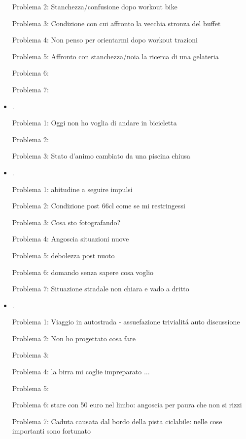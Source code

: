 \begin{itemize}
Problema 2: Stanchezza/confusione dopo workout bike

Problema 3: Condizione con cui affronto la vecchia stronza del buffet

Problema 4: Non penso per orientarmi dopo workout trazioni

Problema 5: Affronto con stanchezza/noia la ricerca di una gelateria

Problema 6: 

Problema 7: 

\item {}.

Problema 1: Oggi non ho voglia di andare in bicicletta

Problema 2: 

Problema 3: Stato d'animo cambiato da una piscina chiusa


\item {}.

Problema 1: abitudine a seguire impulsi

Problema 2: Condizione post 66cl come se mi restringessi

Problema 3: Cosa sto fotografando?

Problema 4: Angoscia situazioni nuove

Problema 5: debolezza post nuoto

Problema 6: domando senza sapere cosa voglio

Problema 7: Situazione stradale non chiara e vado a dritto


\item {}.

Problema 1: Viaggio in autostrada - assuefazione trivialit\'a auto discussione

Problema 2: Non ho progettato cosa fare

Problema 3: 

Problema 4: la birra mi coglie impreparato ...

Problema 5: 

Problema 6: stare con 50 euro nel limbo: angoscia per paura che non si rizzi

Problema 7: Caduta causata dal bordo della pista ciclabile: nelle cose importanti sono fortunato


\end{itemize}
